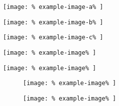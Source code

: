 \documentclass{article}
\let\vamaxheight\relax
\newlength{%
		\vamaxheight%
	}
\begin{document}
\begin{verticallyaligned}
	\noindent
	\begin{minipage}[b][\vamaxheight][b]{%
			.30\textwidth%
		}
		\centering
		\texttt{[image: \%
			example-image-a\%
		]}
	\end{minipage}
	\hfill
	\begin{minipage}[b][\vamaxheight][t]{%
			.10\textwidth%
		}
		\centering
		\texttt{[image: \%
			example-image-b\%
		]}
	\end{minipage}
	\hfill
	\begin{minipage}[b][\vamaxheight][t]{%
			.20\textwidth%
		}
		\centering
		\texttt{[image: \%
			example-image-c\%
		]}
	\end{minipage}
	\hfill
	\begin{minipage}[b][\vamaxheight][c]{%
			.20\textwidth%
		}
		\centering
		\texttt{[image: \%
			example-image\%
		]}
	\end{minipage}
	\hfill
	\begin{minipage}[b][\vamaxheight][t]{%
			.20\textwidth%
		}
		\centering
		\texttt{[image: \%
			example-image\%
		]}
	\end{minipage}
\end{verticallyaligned}

\lipsum[1]

\begin{figure}
	\begin{verticallyaligned}
		\noindent
		\begin{minipage}[b][\vamaxheight][c]{%
				.50\textwidth%
			}
			\centering
			\texttt{[image: \%
				example-image\%
			]}
			\caption{%
			}
		\end{minipage}
		\hfill
		\begin{minipage}[b][\vamaxheight][t]{%
				.40\textwidth%
			}
			\centering
			\texttt{[image: \%
				example-image\%
			]}
			\caption{%
			}
		\end{minipage}
	\end{verticallyaligned}
	\caption{%
	}
\end{figure}
\end{document}
